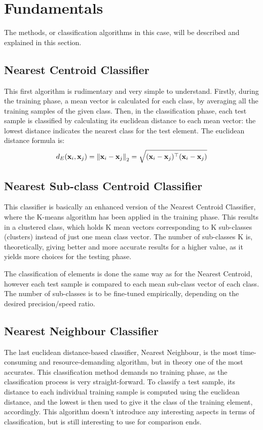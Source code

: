 \section{Fundamentals}
The methods, or classification algorithms in this case, will be described and explained in this section.

\subsection{Nearest Centroid Classifier}
This first algorithm is rudimentary and very simple to understand. Firstly, during the training phase, a mean vector is calculated for each class, by averaging all the training samples of the given class. Then, in the classification phase, each test sample is classified by calculating its euclidean distance to each mean vector: the lowest distance indicates the nearest class for the test element. The euclidean distance formula is: 
\begin{equation}
	d_E(\mathbf{x}_i,\mathbf{x}_j) =\left\lVert \mathbf{x}_i-\mathbf{x}_j\right\rVert_2 = \sqrt{(\mathbf{x}_i-\mathbf{x}_j)^\top(\mathbf{x}_i-\mathbf{x}_j)}
\end{equation}

\subsection{Nearest Sub-class Centroid Classifier}
This classifier is basically an enhanced version of the Nearest Centroid Classifier, where the K-means algorithm has been applied in the training phase. This results in a clustered class, which holds K mean vectors corresponding to K sub-classes (clusters) instead of just one mean class vector. The number of sub-classes K is, theoretically, giving better and more accurate results for a higher value, as it yields more choices for the testing phase.

The classification of elements is done the same way as for the Nearest Centroid, however each test sample is compared to each mean sub-class vector of each class. The number of sub-classes is to be fine-tuned empirically, depending on the desired precision/speed ratio.

\subsection{Nearest Neighbour Classifier}
The last euclidean distance-based classifier, Nearest Neighbour, is the most time-consuming and resource-demanding algorithm, but in theory one of the most accurates. This classification method demands no training phase, as the classification process is very straight-forward. To classify a test sample, its distance to each individual training sample is computed using the euclidean distance, and the lowest is then used to give it the class of the training element, accordingly. This algorithm doesn't introduce any interesting aspects in terms of classification, but is still interesting to use for comparison ends.

